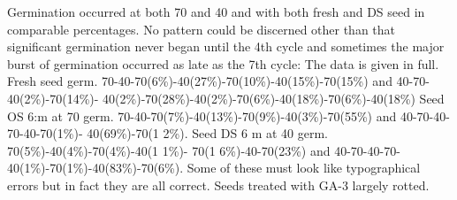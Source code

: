 \begin{description}
Germination occurred at both 70 and 40 and with both fresh and DS seed in
comparable percentages. No pattern could be discerned other than that significant
germination never began until the 4th cycle and sometimes the major burst of
germination occurred as late as the 7th cycle: The data is given in full. Fresh seed
germ. 70-40-70(6\%)-40(27\%)-70(10\%)-40(15\%)-70(15\%) and 40-70-40(2\%)-70(14\%)-
40(2\%)-70(28\%)-40(2\%)-70(6\%)-40(18\%)-70(6\%)-40(18\%) Seed OS 6:m at 70
germ. 70-40-70(7\%)-40(13\%)-70(9\%)-40(3\%)-70(55\%) and 40-70-40-70-40-70(1\%)-
40(69\%)-70(1 2\%). Seed DS 6 m at 40 germ. 70(5\%)-40(4\%)-70(4\%)-40(1 1\%)-
70(1 6\%)-40-70(23\%) and 40-70-40-70-40(1\%)-70(1\%)-40(83\%)-70(6\%). Some of
these must look like typographical errors but in fact they are all correct. Seeds treated
with GA-3 largely rotted.


\end{description}
